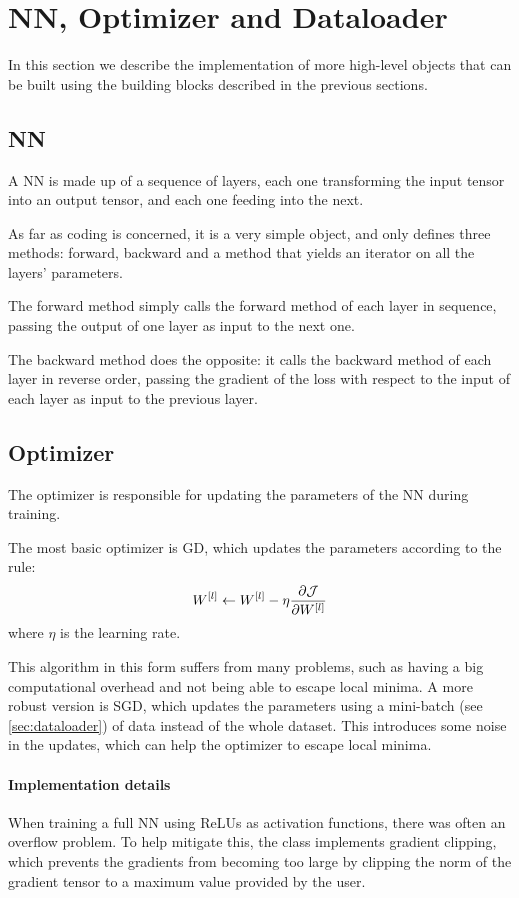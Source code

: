 \section{\acl*{NN}, Optimizer and Dataloader}
In this section we describe the implementation of more high-level objects that can be built using the building blocks described in the previous sections.

\subsection{\acl*{NN}}
A \acl{NN} is made up of a sequence of layers, each one transforming the input tensor into an output tensor, and each one feeding into the next.

As far as coding is concerned, it is a very simple object, and only defines three methods: forward, backward and a method that yields an iterator on all the layers' parameters.

The forward method simply calls the forward method of each layer in sequence, passing the output of one layer as input to the next one.

The backward method does the opposite: it calls the backward method of each layer in reverse order, passing the gradient of the loss with respect to the input of each layer as input to the previous layer.

\subsection{Optimizer}
The optimizer is responsible for updating the parameters of the \acl{NN} during training.

The most basic optimizer is \ac{GD}, which updates the parameters according to the rule:
\begin{equation}
    W^{[l]} \gets W^{[l]} - \eta \pdv{\mathcal{J}}{W^{[l]}}
\end{equation}
where $\eta$ is the learning rate.

This algorithm in this form suffers from many problems, such as having a big computational overhead and not being able to escape local minima. A more robust version is \ac{SGD}, which updates the parameters using a mini-batch (see \cref{sec:dataloader}) of data instead of the whole dataset. This introduces some noise in the updates, which can help the optimizer to escape local minima.

\paragraph{Implementation details} When training a full \ac{NN} using ReLUs as activation functions, there was often an overflow problem. To help mitigate this, the  class implements gradient clipping, which prevents the gradients from becoming too large by clipping the norm of the gradient tensor to a maximum value provided by the user.

